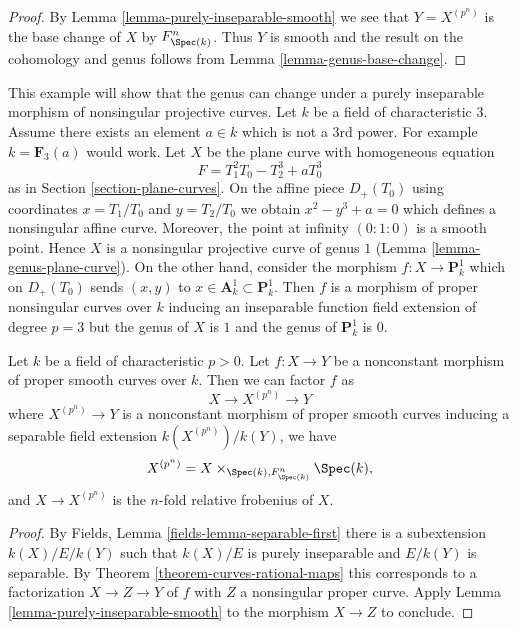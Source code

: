 \begin{proof}
By Lemma \ref{lemma-purely-inseparable-smooth}
we see that $Y = X^{(p^n)}$ is the base change of
$X$ by $F_{\Spec(k)}^n$. Thus $Y$ is smooth and the result on the
cohomology and genus follows from
Lemma \ref{lemma-genus-base-change}.
\end{proof}

\begin{example}
\label{example-inseparable}
This example will show that the genus can change under a
purely inseparable morphism of nonsingular projective curves.
Let $k$ be a field of characteristic $3$. Assume there exists
an element $a \in k$ which is not a $3$rd power. For example
$k = \mathbf{F}_3(a)$ would work. Let $X$ be the plane curve
with homogeneous equation
$$
F = T_1^2T_0 - T_2^3 + aT_0^3
$$
as in Section \ref{section-plane-curves}.
On the affine piece $D_+(T_0)$ using coordinates $x = T_1/T_0$
and $y = T_2/T_0$ we obtain $x^2 - y^3 + a = 0$ which defines
a nonsingular affine curve. Moreover, the point at infinity
$(0 : 1: 0)$ is a smooth point. Hence $X$ is a nonsingular projective
curve of genus $1$ (Lemma \ref{lemma-genus-plane-curve}).
On the other hand, consider the morphism
$f : X \to \mathbf{P}^1_k$ which on $D_+(T_0)$ sends $(x, y)$ to
$x \in \mathbf{A}^1_k \subset \mathbf{P}^1_k$.
Then $f$ is a morphism of proper nonsingular curves over $k$
inducing an inseparable function field extension of degree $p = 3$
but the genus of $X$ is $1$ and the genus of $\mathbf{P}^1_k$ is $0$.
\end{example}

\begin{proposition}
\label{proposition-unwind-morphism-smooth}
Let $k$ be a field of characteristic $p > 0$. Let $f : X \to Y$ be a
nonconstant morphism of proper smooth curves over $k$.
Then we can factor $f$ as
$$
X \longrightarrow X^{(p^n)} \longrightarrow Y
$$
where $X^{(p^n)} \to Y$ is a nonconstant morphism of proper smooth curves
inducing a separable field extension $k(X^{(p^n)})/k(Y)$, we have
$$
X^{(p^n)} = X \times_{\Spec(k), F_{\Spec(k)}^n} \Spec(k),
$$
and $X \to X^{(p^n)}$ is the $n$-fold relative frobenius of $X$.
\end{proposition}

\begin{proof}
By Fields, Lemma \ref{fields-lemma-separable-first}
there is a subextension $k(X)/E/k(Y)$ such that
$k(X)/E$ is purely inseparable and $E/k(Y)$ is separable.
By Theorem \ref{theorem-curves-rational-maps}
this corresponds to a factorization
$X \to Z \to Y$ of $f$ with $Z$ a nonsingular proper curve.
Apply Lemma \ref{lemma-purely-inseparable-smooth}
to the morphism $X \to Z$ to conclude.
\end{proof}

